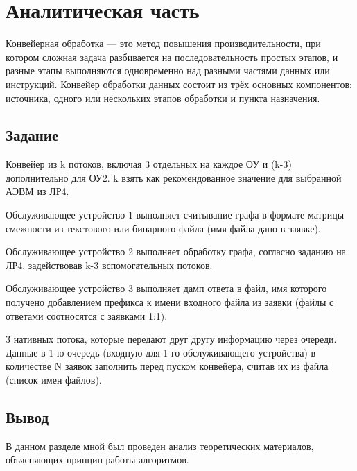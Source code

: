 \chapter{Аналитическая часть}

Конвейерная обработка — это метод повышения производительности, при котором сложная задача разбивается на последовательность простых этапов, и разные этапы выполняются одновременно над разными частями данных или инструкций. 
Конвейер обработки данных состоит из трёх основных компонентов: источника, одного или нескольких этапов обработки и пункта назначения.~\cite{lit2}

\section{Задание}

Конвейер из k потоков, включая 3 отдельных на каждое ОУ и (k-3) дополнительно для ОУ2. k взять как рекомендованное значение для выбранной АЭВМ из ЛР4. 

Обслуживающее устройство 1 выполняет считывание графа в формате матрицы смежности из текстового или бинарного файла (имя файла дано в заявке). 

Обслуживающее устройство 2 выполняет обработку графа, согласно заданию на ЛР4, задействовав k-3 вспомогательных потоков. 

Обслуживающее устройство 3 выполняет дамп ответа в файл, имя которого получено добавлением префикса к имени входного файла из заявки (файлы с ответами соотносятся с заявками 1:1). 

3 нативных потока, которые передают друг другу информацию через очереди. Данные в 1-ю очередь (входную для 1-го обслуживающего устройства) в количестве N заявок заполнить перед пуском конвейера, считав их из файла (список имен файлов).

\section*{Вывод}

В данном разделе мной был проведен анализ теоретических материалов, объясняющих принцип работы алгоритмов.

\clearpage
